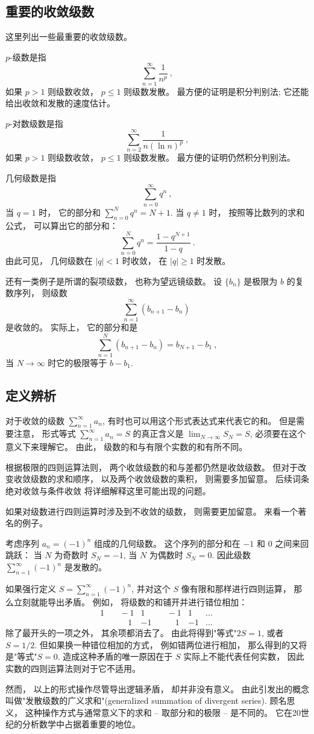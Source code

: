 \subsection{重要的收敛级数}

这里列出一些最重要的收敛级数。

$p$-级数是指
$$
\sum_{n=1}^\infty\frac{1}{n^p}~,
$$
如果 $p>1$ 则级数收敛， $p\leq1$ 则级数发散。 最方便的证明是积分判别法; 它还能给出收敛和发散的速度估计。

$p$-对数级数是指
$$
\sum_{n=2}^\infty\frac{1}{n(\ln n)^p}~,
$$
如果 $p>1$ 则级数收敛， $p\leq1$ 则级数发散。 最方便的证明仍然积分判别法。

几何级数是指
$$
\sum_{n=0}^\infty q^n~,
$$
当 $q=1$ 时， 它的部分和 $\sum_{n=0}^N q^n=N+1$. 当 $q\neq1$ 时， 按照等比数列的求和公式， 可以算出它的部分和：
$$
\sum_{n=0}^N q^n=\frac{1-q^{N+1}}{1-q}~.
$$
由此可见， 几何级数在 $|q|<1$ 时收敛， 在 $|q|\geq1$ 时发散。

还有一类例子是所谓的裂项级数， 也称为望远镜级数。 设 $\{b_n\}$ 是极限为 $b$ 的复数序列， 则级数
$$
\sum_{n=1}^\infty(b_{n+1}-b_n)~
$$
是收敛的。 实际上， 它的部分和是
$$
\sum_{n=1}^N(b_{n+1}-b_n)=b_{N+1}-b_1~,
$$
当 $N\to\infty$ 时它的极限等于 $b-b_1$.

\subsection{定义辨析}
对于收敛的级数 $\sum_{n=1}^\infty a_n$, 有时也可以用这个形式表达式来代表它的和。 但是需要注意， 形式等式 $\sum_{n=1}^\infty a_n=S$ 的真正含义是 $\lim_{N\to\infty}S_N=S$, 必须要在这个意义下来理解它。 由此， 级数的和与有限个实数的和有所不同。 

根据极限的四则运算法则， 两个收敛级数的和与差都仍然是收敛级数。 但对于改变收敛级数的求和顺序， 以及两个收敛级数的乘积， 则需要多加留意。 后续词条绝对收敛与条件收敛 将详细解释这里可能出现的问题。

如果对级数进行四则运算时涉及到不收敛的级数， 则需要更加留意。 来看一个著名的例子。

\begin{example}{}
考虑序列 $a_n=(-1)^n$ 组成的几何级数。 这个序列的部分和在 $-1$ 和 $0$ 之间来回跳跃： 当 $N$ 为奇数时 $S_N=-1$, 当 $N$ 为偶数时 $S_N=0$. 因此级数 $\sum_{n=1}^\infty(-1)^n$ 是发散的。 

如果强行定义 $S=\sum_{n=1}^\infty(-1)^n$, 并对这个 $S$ 像有限和那样进行四则运算， 那么立刻就能导出矛盾。 例如， 将级数的和铺开并进行错位相加：
$$
\begin{aligned}
1 & \quad-1 & 1 & \quad-1 & 1 &...\\
  & \quad\quad1 & -1 & \quad\quad1 & -1 &...
\end{aligned}~
$$
除了最开头的一项之外， 其余项都消去了。 由此将得到"等式"$2S=1$, 或者 $S=1/2$. 但如果换一种错位相加的方式， 例如错两位进行相加， 那么得到的又将是"等式"$S=0$. 造成这种矛盾的唯一原因在于 $S$ 实际上不能代表任何实数， 因此实数的四则运算法则对于它不适用。

然而， 以上的形式操作尽管导出逻辑矛盾， 却并非没有意义。 由此引发出的概念叫做"发散级数的广义求和"(generalized summation of divergent series). 顾名思义， 这种操作方式与通常意义下的求和 -- 取部分和的极限 -- 是不同的。 它在20世纪的分析数学中占据着重要的地位。
\end{example}